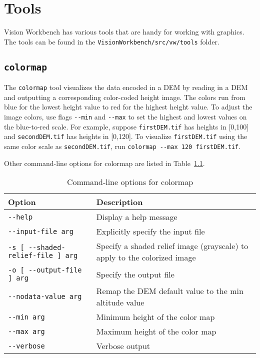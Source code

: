 \chapter{Tools}\label{ch:tools}

Vision Workbench has various tools that are handy for working with graphics. The tools can be found in the \verb#VisionWorkbench/src/vw/tools# folder.

\section{{\tt colormap}}\label{sec:colormap}

The \verb#colormap# tool visualizes the data encoded in a DEM by reading in a DEM and outputting a corresponding color-coded height image. The colors run from blue for the lowest height value to red for the highest height value.  To adjust the image colors, use flags \verb#--min# and \verb#--max# to set the highest and lowest values on the blue-to-red scale.  For example, suppose \verb#firstDEM.tif# has heights in [0,100] and \verb#secondDEM.tif# has heights in [0,120]. To visualize \verb#firstDEM.tif# using the same color scale as \verb#secondDEM.tif#, run \verb#colormap --max 120 firstDEM.tif#.

Other command-line options for colormap are listed in Table~\ref{tbl:colormap}.

\begin{longtable}{|l|p{10cm}|}
\caption{Command-line options for colormap}
\label{tbl:colormap}
\endfirsthead
\endhead
\endfoot
\endlastfoot
\hline
Option & Description \\ \hline \hline
\verb#--help# & Display a help message \\ \hline
\verb#--input-file arg# & Explicitly specify the input file \\ \hline
\verb#-s [ --shaded-relief-file ] arg# & Specify a shaded relief image (grayscale) to apply to the colorized image \\ \hline
\verb#-o [ --output-file ] arg# & Specify the output file \\ \hline
\verb#--nodata-value arg# & Remap the DEM default value to the min altitude value \\ \hline
\verb#--min arg# & Minimum height of the color map \\ \hline
\verb#--max arg# & Maximum height of the color map \\ \hline
\verb#--verbose# & Verbose output \\ \hline
\end{longtable}

